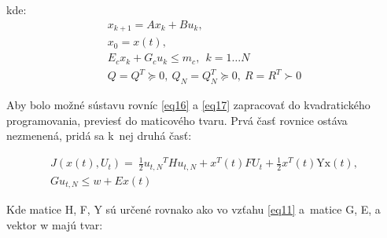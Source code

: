 kde:
\begin{equation} \label{eq17}
\begin{split}
x_{k + 1} = Ax_{k} + Bu_{k}, \\
x_{0} = x\left( t \right), \\
E_{c}x_{k} + G_{c}u_{k} \leq m_{c},\ \ k = 1\ldots N \\
Q = Q^{T} \succcurlyeq 0,\ Q_{N} = Q_{N}^{T} \succcurlyeq 0,\ R = R^{T} \succ 0
\end{split}
\end{equation}

Aby bolo možné sústavu rovníc \ref{eq16} a \ref{eq17} zapracovať do kvadratického programovania, previesť do maticového tvaru. Prvá časť rovnice ostáva nezmenená, pridá sa k~nej druhá časť:

\begin{equation} \label{eq18}
\begin{split}
J\left( x\left( t \right),U_{t} \right) = \ \frac{1}{2}{u_{t,N}}^{T}Hu_{t,N} + x^{T}\left( t \right)FU_{t} + \frac{1}{2}x^{T}\left( t \right)\text{Yx}\left( t \right), \\
Gu_{t,N} \leq w + Ex(t)
\end{split}
\end{equation}

Kde matice H, F, Y sú určené rovnako ako vo vzťahu \ref{eq11} a~matice G, E, a
vektor w majú tvar:

